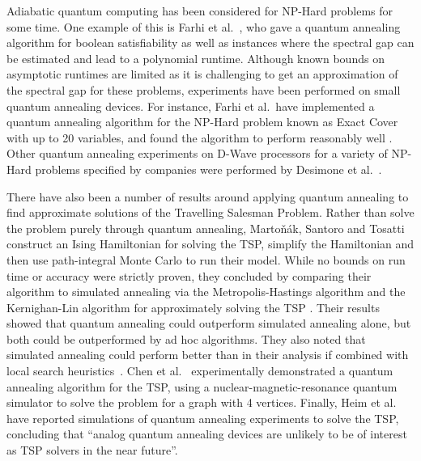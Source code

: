 Adiabatic quantum computing has been considered for NP-Hard problems for some time. One example of this is Farhi et al.\ \cite{farhi2000}, who gave a quantum annealing algorithm for boolean satisfiability as well as instances where the spectral gap can be estimated and lead to a polynomial runtime. Although known bounds on asymptotic runtimes are limited as it is challenging to get an approximation of the spectral gap for these problems, experiments have been performed on small quantum annealing devices. For instance, Farhi et al.\ have implemented a quantum annealing algorithm for the NP-Hard problem known as Exact Cover with up to 20 variables, and found the algorithm to perform reasonably well \cite{farhi2001}. Other quantum annealing experiments on D-Wave processors for a variety of NP-Hard problems specified by companies were performed by Desimone et al.\ \cite{desimone2018}.

There have also been a number of results around applying quantum annealing to find approximate solutions of the Travelling Salesman Problem. Rather than solve the problem purely through quantum annealing, Marto\v{n}\'ak, Santoro and Tosatti \cite{martonak2004} construct an Ising Hamiltonian for solving the TSP, simplify the Hamiltonian and then use path-integral Monte Carlo \cite{barker1979} to run their model. While no bounds on run time or accuracy were strictly proven, they concluded by comparing their algorithm to simulated annealing via the Metropolis-Hastings algorithm \cite{metropolis1953} and the Kernighan-Lin algorithm for approximately solving the TSP \cite{kernighan1970}. Their results showed that quantum annealing could outperform simulated annealing alone, but both could be outperformed by ad hoc algorithms. They also noted that simulated annealing could perform better than in their analysis if combined with local search heuristics~\cite{martin1996}. Chen et al.\ \cite{chen11} experimentally demonstrated a quantum annealing algorithm for the TSP, using a nuclear-magnetic-resonance quantum simulator to solve the problem for a graph with 4 vertices. Finally, Heim et al.~\cite{heim2017} have reported simulations of quantum annealing experiments to solve the TSP, concluding that ``analog quantum annealing devices are unlikely to be of interest as TSP solvers in the near future''.
